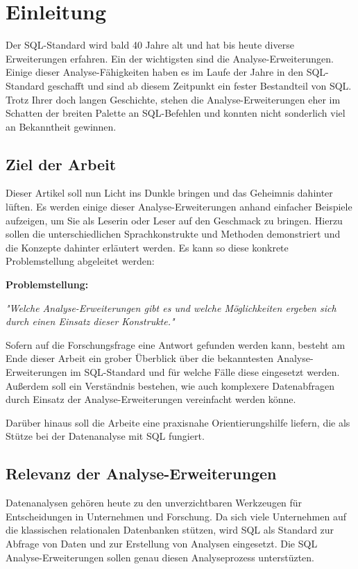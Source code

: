 \chapter{Einleitung}
Der SQL-Standard wird bald 40 Jahre alt und hat bis heute diverse
Erweiterungen erfahren. Ein der wichtigsten sind die Analyse-Erweiterungen. Einige
dieser Analyse-Fähigkeiten haben es im Laufe der Jahre in den SQL-Standard
geschafft und sind ab diesem Zeitpunkt ein fester Bestandteil von SQL. Trotz Ihrer doch
langen Geschichte, stehen die Analyse-Erweiterungen eher im Schatten der breiten
Palette an SQL-Befehlen und konnten nicht sonderlich viel an Bekanntheit gewinnen.


\section{Ziel der Arbeit}
Dieser Artikel soll nun Licht ins Dunkle bringen und das Geheimnis dahinter lüften.
Es werden einige dieser Analyse-Erweiterungen anhand einfacher Beispiele aufzeigen,
um Sie als Leserin oder Leser auf den Geschmack zu bringen. Hierzu sollen die
unterschiedlichen Sprachkonstrukte und Methoden demonstriert und die Konzepte
dahinter erläutert werden. Es kann so diese konkrete Problemstellung abgeleitet
werden:

\textbf{Problemstellung:}
\begin{center}
    \textit{"Welche Analyse-Erweiterungen gibt es und welche Möglichkeiten ergeben sich durch
    einen Einsatz dieser Konstrukte."}
\end{center}

Sofern auf die Forschungsfrage eine Antwort gefunden werden kann, besteht am Ende
dieser Arbeit ein grober Überblick über die bekanntesten Analyse-Erweiterungen im
SQL-Standard und für welche Fälle diese eingesetzt werden. Außerdem soll
ein Verständnis bestehen, wie auch komplexere Datenabfragen durch Einsatz der
Analyse-Erweiterungen vereinfacht werden könne.

Darüber hinaus soll die Arbeite eine praxisnahe Orientierungshilfe liefern, die als
Stütze bei der Datenanalyse mit SQL fungiert.


\section{Relevanz der Analyse-Erweiterungen}
Datenanalysen gehören heute zu den unverzichtbaren Werkzeugen für Entscheidungen
in Unternehmen und Forschung. Da sich viele Unternehmen auf die klassischen
relationalen Datenbanken stützen, wird SQL als Standard zur Abfrage von Daten und
zur Erstellung von Analysen eingesetzt. Die SQL Analyse-Erweiterungen sollen genau
diesen Analyseprozess unterstüzten.

